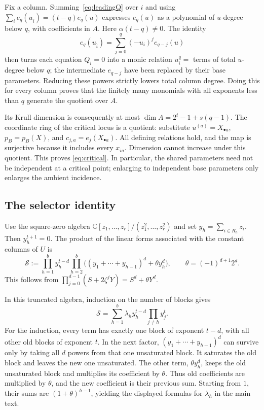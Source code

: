 \documentclass[11pt]{article}
\theoremstyle{remark}\newtheorem{remark}[theorem]{Remark}
\newcommand{\C}{\mathbb C}
\begin{document}
Fix a column. Summing~\eqref{eq:leadingQ} over $i$ and using
$\sum_i e_q(u_{\widehat i})=(t-q)e_q(u)$ expresses $e_q(u)$
as a polynomial of $u$-degree below $q$, with coefficients in $A$.
Here $\alpha(t-q)\ne0$. The identity
\[
 e_q(u_{\widehat i})=
       \sum_{j=0}^q(-u_i)^j e_{q-j}(u)
\]
then turns each equation $Q_i=0$ into a monic relation
$u_i^q=$ terms of total $u$-degree below $q$; the intermediate
$e_{q-j}$ have been replaced by their base parameters.
Reducing these powers strictly lowers total column degree.
Doing this for every column proves that the finitely many monomials
with all exponents less than $q$ generate the quotient over $A$.

Its Krull dimension is consequently at most
$\dim A=2^t-1+s(q-1)$. The coordinate ring of the critical locus
is a quotient: substitute $u^{(a)}=X_{\bullet a}$,
$p_B=p_B(X)$, and $c_{j,a}=e_j(X_{\bullet a})$. All defining
relations hold, and the map is surjective because it includes every
$x_{ia}$. Dimension cannot increase under this quotient. This proves
\eqref{eq:critical}. In particular, the shared parameters need not
be independent at a critical point; enlarging to independent base
parameters only enlarges the ambient incidence.



\subsection{The selector identity}

Use the square-zero algebra
$\C[z_1,\ldots,z_r]/(z_1^2,\ldots,z_r^2)$ and set
$y_h=\sum_{i\in R_h}z_i$. Then $y_h^{t+1}=0$. The product of
the linear forms associated with the constant columns of $U$ is
\begin{equation}\label{eq:selectorproduct}
 \mathcal S:=\prod_{h=1}^b y_h^{t-d}
 \prod_{h=2}^b
       \bigl((y_1+\cdots+y_{h-1})^d+\theta y_h^d\bigr),
 \qquad \theta=(-1)^{d+1}2^d.
\end{equation}
This follows from
$\prod_{j=0}^{d-1}(S+2\zeta^jY)=S^d+\theta Y^d$.

In this truncated algebra, induction on the number of blocks gives
\begin{equation}\label{eq:selectorcollapsed}
 \mathcal S
   =\sum_{h=1}^b\lambda_h y_h^{t-d}\prod_{j\ne h}y_j^t.
\end{equation}
For the induction, every term has exactly one block of exponent
$t-d$, with all other old blocks of exponent $t$. In the next
factor, $(y_1+\cdots+y_{h-1})^d$ can survive only by taking all
$d$ powers from that one unsaturated block. It saturates the old
block and leaves the new one unsaturated. The other term,
$\theta y_h^d$, keeps the old unsaturated block and multiplies
its coefficient by $\theta$. Thus old coefficients are multiplied
by $\theta$, and the new coefficient is their previous sum.
Starting from $1$, their sums are $(1+\theta)^{h-1}$, yielding
the displayed formulas for $\lambda_h$ in the main text.
\end{document}
